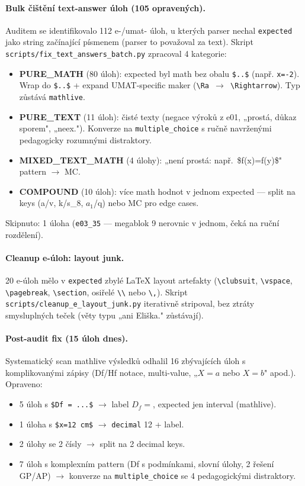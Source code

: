 \documentclass[11pt,a4paper]{article}
\begin{document}
\paragraph{Bulk čištění text-answer úloh (105 opravených).} Auditem se identifikovalo 112 e-/umat- úloh, u kterých parser nechal \texttt{expected} jako string začínající písmenem (parser to považoval za text). Skript \texttt{scripts/fix\_text\_answers\_batch.py} zpracoval 4 kategorie:
\begin{itemize}
  \item \textbf{PURE\_MATH} (80 úloh): expected byl math bez obalu \texttt{\$..\$} (např. \texttt{x=-2}). Wrap do \texttt{\$..\$} + expand UMAT-specific maker (\texttt{\textbackslash Ra $\rightarrow$ \textbackslash Rightarrow}). Typ zůstává \texttt{mathlive}.
  \item \textbf{PURE\_TEXT} (11 úloh): čisté texty (negace výroků z e01, „prostá, důkaz sporem", „neex."). Konverze na \texttt{multiple\_choice} s ručně navrženými pedagogicky rozumnými distraktory.
  \item \textbf{MIXED\_TEXT\_MATH} (4 úlohy): „není prostá: např.~\$f(x)=f(y)\$" pattern $\rightarrow$ MC.
  \item \textbf{COMPOUND} (10 úloh): více math hodnot v jednom expected --- split na keys (a/v, k/s\_8, $a_1$/q) nebo MC pro edge cases.
\end{itemize}
Skipnuto: 1 úloha (\texttt{e03\_35} --- megablok 9 nerovnic v jednom, čeká na ruční rozdělení).

\paragraph{Cleanup e-úloh: layout junk.} 20 e-úloh mělo v \texttt{expected} zbylé LaTeX layout artefakty (\texttt{\textbackslash clubsuit}, \texttt{\textbackslash vspace}, \texttt{\textbackslash pagebreak}, \texttt{\textbackslash section}, osiřelé \texttt{\textbackslash \textbackslash} nebo \texttt{\textbackslash ,}). Skript \texttt{scripts/cleanup\_e\_layout\_junk.py} iterativně stripoval, bez ztráty smysluplných teček (věty typu „ani Eliška." zůstávají).

\paragraph{Post-audit fix (15 úloh dnes).} Systematický scan mathlive výsledků odhalil 16 zbývajících úloh s komplikovanými zápisy (Df/Hf notace, multi-value, „$X=a$ nebo $X=b$" apod.). Opraveno:
\begin{itemize}
  \item 5 úloh s \texttt{\$Df = ...\$} $\rightarrow$ label \texttt{$D_f =$}, expected jen interval (mathlive).
  \item 1 úloha s \texttt{\$x=12 cm\$} $\rightarrow$ \texttt{decimal} 12 + label.
  \item 2 úlohy se 2 čísly $\rightarrow$ split na 2 decimal keys.
  \item 7 úloh s komplexním pattern (Df s podmínkami, slovní úlohy, 2 řešení GP/AP) $\rightarrow$ konverze na \texttt{multiple\_choice} se 4 pedagogickými distraktory.
\end{itemize}
\end{document}
